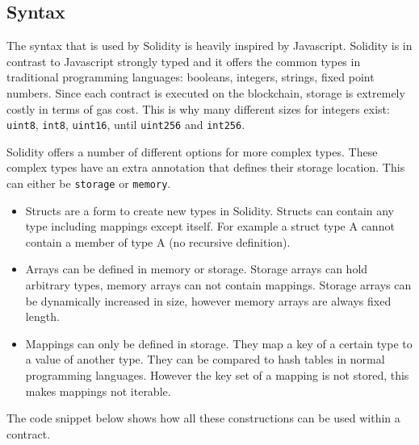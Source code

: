 \documentclass[a4paper]{article}
\begin{document}
\subsection{Syntax}
The syntax that is used by Solidity is heavily inspired by Javascript. Solidity is in contrast to Javascript strongly typed and it offers the common types in traditional programming languages: booleans, integers, strings, fixed point numbers. Since each contract is executed on the blockchain, storage is extremely costly in terms of gas cost. This is why many different sizes for integers exist: \texttt{uint8}, \texttt{int8}, \texttt{uint16}, until \texttt{uint256} and \texttt{int256}. \par
Solidity offers a number of different options for more complex types. These complex types have an extra annotation that defines their storage location. This can either be \texttt{storage} or \texttt{memory}. 
\begin{itemize}
    \item Structs are a form to create new types in Solidity. Structs can contain any type including mappings except itself. For example a struct type A cannot contain a member of type A (no recursive definition).  
    \item Arrays can be defined in memory or storage. Storage arrays can hold arbitrary types, memory arrays can not contain mappings. Storage arrays can be dynamically increased in size, however memory arrays are always fixed length.  
    \item Mappings can only be defined in storage. They map a key of a certain type to a value of another type. They can be compared to hash tables in normal programming languages. However the key set of a mapping is not stored, this makes mappings not iterable. 
\end{itemize}
The code snippet below shows how all these constructions can be used within a contract.
\end{document}
